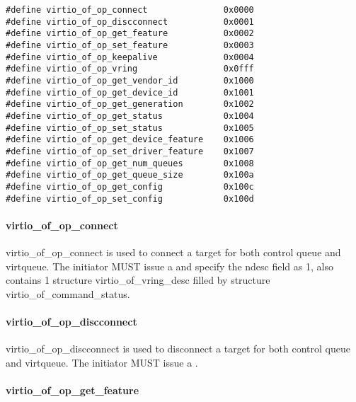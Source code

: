 \begin{lstlisting}
#define virtio_of_op_connect               0x0000
#define virtio_of_op_discconnect           0x0001
#define virtio_of_op_get_feature           0x0002
#define virtio_of_op_set_feature           0x0003
#define virtio_of_op_keepalive             0x0004
#define virtio_of_op_vring                 0x0fff
#define virtio_of_op_get_vendor_id         0x1000
#define virtio_of_op_get_device_id         0x1001
#define virtio_of_op_get_generation        0x1002
#define virtio_of_op_get_status            0x1004
#define virtio_of_op_set_status            0x1005
#define virtio_of_op_get_device_feature    0x1006
#define virtio_of_op_set_driver_feature    0x1007
#define virtio_of_op_get_num_queues        0x1008
#define virtio_of_op_get_queue_size        0x100a
#define virtio_of_op_get_config            0x100c
#define virtio_of_op_set_config            0x100d
\end{lstlisting}

\paragraph{virtio_of_op_connect}\label{sec:Virtio Transport Options / Virtio Over Fabrics / Transmission Protocol / Opcodes Definition / virtio_of_op_connect}

virtio_of_op_connect is used to connect a target for both control queue and virtqueue.
The initiator MUST issue a 
and specify the ndesc field as 1, also contains 1 structure virtio_of_vring_desc
filled by structure virtio_of_command_status.

\paragraph{virtio_of_op_discconnect}\label{sec:Virtio Transport Options / Virtio Over Fabrics / Transmission Protocol / Opcodes Definition / virtio_of_op_discconnect}

virtio_of_op_discconnect is used to disconnect a target for both control queue and virtqueue.
The initiator MUST issue a .

\paragraph{virtio_of_op_get_feature}\label{sec:Virtio Transport Options / Virtio Over Fabrics / Transmission Protocol / Opcodes Definition / virtio_of_op_get_feature}

